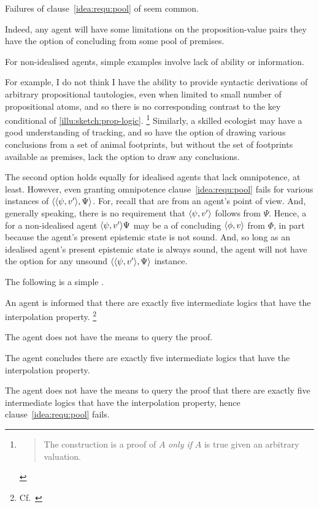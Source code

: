 \begin{note}
  Failures of clause~\ref{idea:requ:pool} of \iRequ{} seem common.

  Indeed, any agent will have some limitations on the proposition-value pairs they have the option of concluding from some pool of premises.

  For non-idealised agents, simple examples involve lack of ability or information.

  For example, I do not think I have the ability to provide syntactic derivations of arbitrary propositional tautologies, even when limited to small number of propositional atoms, and so there is no corresponding contrast to the key conditional of \autoref{illu:sketch:prop-logic}.%
  \footnote{
    \begin{quote}
      The construction is a proof of \(A\) \emph{only if} \(A\) is true given an arbitrary valuation.
    \end{quote}
  }
  Similarly, a skilled ecologist may have a good understanding of tracking, and so have the option of drawing various conclusions from a set of animal footprints, but without the set of footprints available as premises, lack the option to draw any conclusions.

  The second option holds equally for idealised agents that lack omnipotence, at least.
  However, even granting omnipotence clause~\ref{idea:requ:pool} fails for various instances of \(\langle \langle \psi, v' \rangle, \Psi \rangle\).
  For, recall that  are from an agent's point of view.
  And, generally speaking, there is no requirement that \(\langle \psi, v' \rangle\) follows from \(\Psi\).
  Hence, a for a non-idealised agent \(\langle \psi, v' \rangle{\Psi}\) may be a \requ{} of concluding \(\langle \phi, v \rangle\) from \(\Phi\), in part because the agent's present epistemic state is not sound.
  And, so long as an idealised agent's present epistemic state is always sound, the agent will not have the option for any unsound \(\langle \langle \psi, v' \rangle, \Psi \rangle\) instance.
\end{note}

\begin{note}
  The following is a simple .

  \begin{illustration}
    \label{illu:testimony-layperson}
    An agent is informed that there are exactly five intermediate logics that have the interpolation property.\nolinebreak
  \footnote{Cf.\ \textcite{Maksimova:1977un}}

    The agent does not have the means to query the proof.

    The agent concludes there are exactly five intermediate logics that have the interpolation property.
  \end{illustration}

  The agent does not have the means to query the proof that there are exactly five intermediate logics that have the interpolation property, hence clause~\ref{idea:requ:pool} fails.
\end{note}

